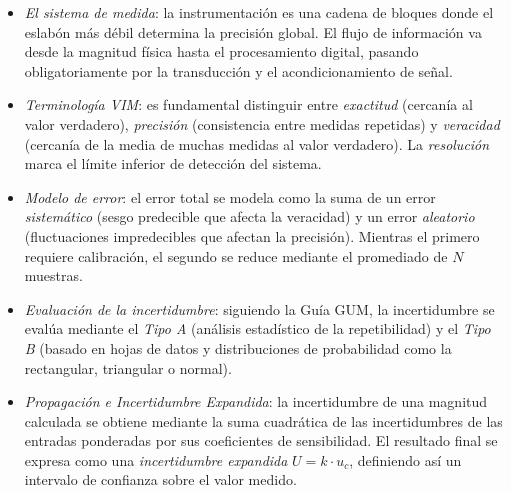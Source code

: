 \begin{itemize}
    \item \emph{El sistema de medida}: la instrumentación es una cadena de bloques donde el eslabón más débil determina la precisión global. El flujo de información va desde la magnitud física hasta el procesamiento digital, pasando obligatoriamente por la transducción y el acondicionamiento de señal.
    \item \emph{Terminología VIM}: es fundamental distinguir entre \emph{exactitud} (cercanía al valor verdadero), \emph{precisión} (consistencia entre medidas repetidas) y \emph{veracidad} (cercanía de la media de muchas medidas al valor verdadero). La \emph{resolución} marca el límite inferior de detección del sistema.
    \item \emph{Modelo de error}: el error total se modela como la suma de un error \emph{sistemático} (sesgo predecible que afecta la veracidad) y un error \emph{aleatorio} (fluctuaciones impredecibles que afectan la precisión). Mientras el primero requiere calibración, el segundo se reduce mediante el promediado de $N$ muestras.
    \item \emph{Evaluación de la incertidumbre}: siguiendo la Guía GUM, la incertidumbre se evalúa mediante el \emph{Tipo A} (análisis estadístico de la repetibilidad) y el \emph{Tipo B} (basado en hojas de datos y distribuciones de probabilidad como la rectangular, triangular o normal).
    \item \emph{Propagación e Incertidumbre Expandida}: la incertidumbre de una magnitud calculada se obtiene mediante la suma cuadrática de las incertidumbres de las entradas ponderadas por sus coeficientes de sensibilidad. El resultado final se expresa como una \emph{incertidumbre expandida} $U = k \cdot u_c$, definiendo así un intervalo de confianza sobre el valor medido.
\end{itemize}


